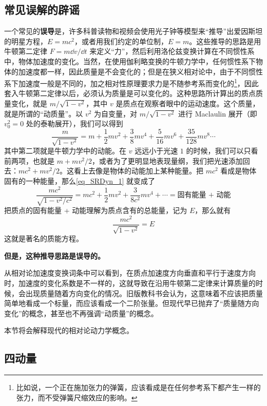 \subsection{常见误解的辟谣}
一个常见的\textbf{误导}是，许多科普读物和视频会使用光子钟等模型来“推导”出爱因斯坦的明星方程，$E=mc^2$，或者用我们约定的单位制，$E=m$。这些推导的思路是用牛顿第二定律 $F=m\dd v/\dd t$ 来定义“力”，然后利用洛伦兹变换计算在不同惯性系中，物体加速度的变化。当然，在使用伽利略变换的牛顿力学中，任何惯性系下物体的加速度都一样，因此质量是不会变化的；但是在狭义相对论中，由于不同惯性系下加速度一般是不同的，加之相对性原理要求力是不随参考系而变化的\footnote{比如说，一个正在施加张力的弹簧，应该看成是在任何参考系下都产生一样的张力，而不受弹簧尺缩效应的影响。}，因此套入牛顿第二定律以后，必须认为质量是可以变化的。这种思路所计算出的质点质量变化，就是 $m/\sqrt{1-v^2}$，其中 $v$ 是质点在观察者眼中的运动速度。这个质量，就是所谓的“动质量”。以 $v^2$ 为自变量，对 $m/\sqrt{1-v^2}$ 进行 Maclaulin 展开（即 $v_0^2=0$ 处的泰勒展开），我们可以得到
\begin{equation}\label{eq_SRDyn_1}
\frac{m}{\sqrt{1-v^2}} = m+\frac{1}{2}mv^2+\frac{3}{8}mv^4+\frac{5}{16}mv^6 + \frac{35}{128}mv^8\cdots
\end{equation}
其中第二项就是牛顿力学中的动能。在 $v$ 远远小于光速 $1$ 的时候，我们可以只看前两项，也就是 $m+mv^2/2$，或者为了更明显地表现量纲，我们把光速添加回去：$mc^2+mv^2/2$。这看上去像是物体的动能加上某种能量。把 $mc^2$ 看成是物体固有的一种能量，那么\autoref{eq_SRDyn_1} 就变成了
\begin{equation}
\frac{mc^2}{\sqrt{1-v^2/c^2}} = mc^2+\frac{1}{2}mv^2+\frac{3}{8c^2}mv^4+\cdots=\text{固有能量 + 动能}
\end{equation}
把质点的固有能量 + 动能理解为质点含有的总能量，记为 $E$，那么就有
\begin{equation}
\frac{mc^2}{\sqrt{1-v^2}} = E
\end{equation}
这就是著名的质能方程。

\textbf{但是，这种推导思路是误导的。}


从相对论加速度变换词条中可以看到，在质点加速度方向垂直和平行于速度方向时，加速度的变化系数是不一样的，这就导致在沿用牛顿第二定律来计算质量的时候，会出现质量随着方向变化的情况。旧版教科书会认为，这意味着不应该把质量简单地看成一个标量，而应该看成一个二阶张量。但现代早已抛弃了“质量随方向变化”的概念，甚至也不再强调“动质量”的概念。

本节将会解释现代的相对论动力学概念。

\subsection{四动量}

